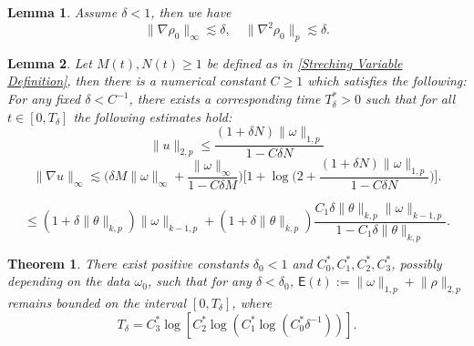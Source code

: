 \documentclass[10pt,a4paper]{amsart}
\newtheorem{lem}{Lemma}
\newtheorem{thm}{Theorem}
\begin{document}
\begin{lem}\label{Rho 0 Estimate}
Assume $\delta<1$, then we have
\begin{equation}
 \lVert\nabla\rho_0\rVert_\infty\lesssim \delta,\quad \lVert \nabla^2\rho_0\rVert_p\lesssim\delta.
\end{equation}
\end{lem}

\begin{lem}\label{Estimates of u}
Let $M(t),N(t)\ge 1$ be defined as in \eqref{Streching Variable Definition}, then
 there is a numerical constant $C\ge 1$ which satisfies the following: For any fixed  $\delta<C^{-1}$, there exists a corresponding time $T_\delta^*>0$ such that for all $t\in [0,T_\delta]$ the following estimates hold:
\begin{equation}\label{W2p estimate for u}
 \lVert u\rVert_{2,p}\le  \frac{ (1+\delta N)\lVert\omega\rVert_{1,p}}{1-C\delta N}
\end{equation}
\begin{equation}\label{Linfty estimate for nabla u}
 \lVert\nabla u\rVert_\infty\lesssim   \Big(\delta M\lVert\omega\rVert_\infty+\frac{ \lVert\omega\rVert_\infty}{1-C\delta M}\Big)\Big[1+\log 
 \Big(2+\frac{ (1+\delta N)\lVert\omega\rVert_{1,p}}{1-C\delta N}\Big)\Big].
\end{equation}
\end{lem}

\begin{equation}\label{u Wk,p Estimate}
 \le (1+\delta \lVert\theta\rVert_{k,p})\lVert\omega\rVert_{k-1,p}+(1+\delta \lVert\theta\rVert_{k,p})\frac{C_1\delta \lVert \theta\rVert_{k,p}\lVert \omega\rVert_{k-1,p}}{1-C_1\delta \lVert \theta\rVert_{k,p}}.   
\end{equation}

\begin{thm}\label{Lifespan of IIE}
There exist positive constants $\delta_0<1$ and $C_0^*,C_1^*, C_2^*,C_3^*$, possibly depending on the data $\omega_0$, such that for any $\delta<\delta_0$, $\mathsf E(t):=\lVert\omega\rVert_{1,p}+\lVert\rho\rVert_{2,p}$ remains bounded on the interval $[0,T_\delta]$, where
\begin{equation*}
 T_\delta=C_3^*\log[C_2^*\log( C_1^*\log (C_0^*\delta^{-1}))]. 
\end{equation*}
\end{thm}
\end{document}
